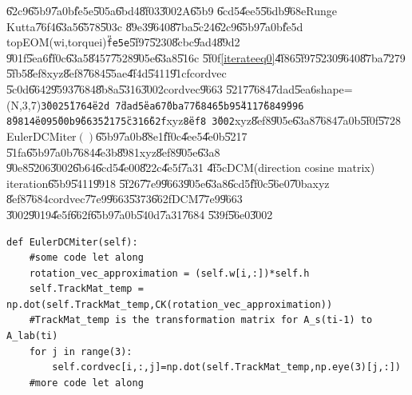 \U{62c9}\U{65b9}\U{7a0b}\U{fe5e}\U{505a}\U{6bd4}\U{8f03}\U{3002}A\U{65b9}%
\U{6cd5}\U{4ee5}\U{56db}\U{968e}Runge Kutta\U{76f4}\U{63a5}\U{6578}\U{503c}%
\U{89e3}\U{9640}\U{87ba}\U{5c24}\U{62c9}\U{65b9}\U{7a0b}\U{fe5d}%
topEOM(wi,torquei)\texttt{\U{fe5e}}\U{5f97}\U{5230}\U{8cbc}\U{9ad4}\U{89d2}%
\U{901f}\U{5ea6}\U{ff0c}\U{63a5}\U{8457}\U{7528}\U{905e}\U{63a8}\U{516c}%
\U{5f0f}\ref{iterateeq0}\U{4f86}\U{5f97}\U{5230}\U{9640}\U{87ba}\U{7279}%
\U{5fb5}\U{8ef8}xyz\U{8ef8}\U{7684}\U{55ae}\U{4f4d}\U{5411}\U{91cf}cordvec%
\U{5c0d}\U{6642}\U{9593}\U{7684}\U{8b8a}\U{5316}\U{3002}cordvec\U{9663}%
\U{5217}\U{7684}\U{7dad}\U{5ea6}shape=(N,3,7)\texttt{\U{3002}\U{5176}\U{4e2d}%
\U{7dad}\U{5ea6}\U{70ba}}7\texttt{\U{7684}\U{65b9}\U{5411}\U{7684}\U{9996}%
\U{8981}\U{4e09}\U{500b}\U{9663}\U{5217}\U{5c31}\U{662f}}xyz\texttt{\U{8ef8}%
\U{3002}}xyz\U{8ef8}\U{905e}\U{63a8}\U{7684}\U{7a0b}\U{5f0f}\U{5728}%
EulerDCMiter$()$\U{65b9}\U{7a0b}\U{88e1}\U{ff0c}\U{4ee5}\U{4e0b}\U{5217}%
\U{51fa}\U{65b9}\U{7a0b}\U{7684}\U{4e3b}\U{8981}xyz\U{8ef8}\U{905e}\U{63a8}%
\U{90e8}\U{5206}\U{3002}\U{6b64}\U{6cd5}\U{4e00}\U{822c}\U{4e5f}\U{7a31}%
\U{4f5c}DCM(direction cosine matrix) iteration\U{65b9}\U{5411}\U{9918}%
\U{5f26}\U{77e9}\U{9663}\U{905e}\U{63a8}\U{6cd5}\U{ff0c}\U{56e0}\U{70ba}xyz%
\U{8ef8}\U{7684}cordvec\U{77e9}\U{9663}\U{5373}\U{662f}DCM\U{77e9}\U{9663}%
\U{3002}\U{9019}\U{4e5f}\U{662f}\U{65b9}\U{7a0b}\U{540d}\U{7a31}\U{7684}%
\U{539f}\U{56e0}\U{3002}

\begin{mdframed}[leftline=false, rightline=false,backgroundcolor=bg]
\begin{verbatim}
def EulerDCMiter(self):
    #some code let along
    rotation_vec_approximation = (self.w[i,:])*self.h
    self.TrackMat_temp = np.dot(self.TrackMat_temp,CK(rotation_vec_approximation))
    #TrackMat_temp is the transformation matrix for A_s(ti-1) to A_lab(ti)
    for j in range(3):
        self.cordvec[i,:,j]=np.dot(self.TrackMat_temp,np.eye(3)[j,:])
    #more code let along
\end{verbatim}
\end{mdframed}

